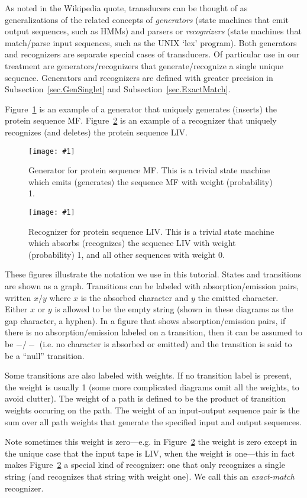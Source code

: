 \documentclass{article}
\newcommand{\secref}[1]{Subsection~\ref{sec.#1}}
\newcommand{\figref}[1]{Figure~\ref{Figures.#1}}
\newcommand{\figlabel}[1]{\label{Figures.#1}}
\newcommand{\easyfig}[4]{
\begin{figure}
\texttt{[image: \#1]}
\caption{ \figlabel{#3} #4}
\end{figure}}
\newcommand{\pngfig}[2]{\easyfig{#1.png}{}{#1}{#2}}
\begin{document}
As noted in the Wikipedia quote, transducers can be thought of as generalizations of the related
concepts of {\em generators} (state machines that emit output sequences, such as HMMs)
and parsers or {\em recognizers} (state machines that match/parse input sequences, such as the UNIX `lex' program).
Both generators and recognizers are separate special cases of transducers.
Of particular use in our treatment are generators/recognizers that generate/recognize a single unique sequence.
Generators and recognizers are defined with greater precision in \secref{GenSinglet} and \secref{ExactMatch}.


\figref{mf-generator} is an example of a generator that uniquely generates (inserts) the protein sequence MF.
\figref{liv-small} is an example of a recognizer that uniquely recognizes (and deletes) the protein sequence LIV.

\pngfig{mf-generator}{Generator for protein sequence MF.  
This is a trivial state machine which emits (generates) the sequence MF with weight (probability) 1. }

\pngfig{liv-small}{Recognizer for protein sequence LIV.
This is a trivial state machine which absorbs (recognizes) the sequence LIV with weight (probability) 1, and all other sequences with weight 0.  }

These figures illustrate the notation we use in this tutorial.
States and transitions are shown as a graph.
Transitions can be labeled with absorption/emission pairs,
written $x/y$ where $x$ is the absorbed character and $y$ the emitted character.
Either $x$ or $y$ is allowed to be the empty string (shown in these diagrams as the gap character, a hyphen).
In a figure that shows absorption/emission pairs,
if there is no absorption/emission labeled on a transition, then it can be assumed to be $-/-$
(i.e. no character is absorbed or emitted) and the transition is said to be a ``null'' transition.

Some transitions are also labeled with weights.
If no transition label is present, the weight is usually 1
(some more complicated diagrams omit all the weights, to avoid clutter).
The weight of a path is defined to be the  product of transition weights occuring on the path. 
The weight of an input-output sequence pair is the sum over all path weights that generate the
specified  input and output sequences.  

Note sometimes this weight is zero---e.g. in \figref{liv-small} the weight is zero
except in the unique case that the input tape is LIV, when the weight is one---this
in fact makes \figref{liv-small} a special kind of recognizer:
one that only recognizes a single string
(and recognizes that string with weight one).
We call this an {\em exact-match} recognizer.
\end{document}
